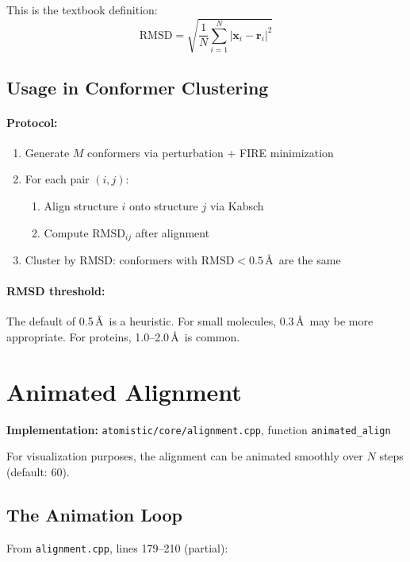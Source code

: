 \documentclass[11pt]{article}
\begin{document}
This is the textbook definition:
\begin{equation}
\text{RMSD} = \sqrt{\frac{1}{N}\sum_{i=1}^{N} |\mathbf{x}_i - \mathbf{r}_i|^2}
\end{equation}

\subsection{Usage in Conformer Clustering}

\paragraph{Protocol:}
\begin{enumerate}
\item Generate $M$ conformers via perturbation + FIRE minimization
\item For each pair $(i, j)$:
\begin{enumerate}
\item Align structure $i$ onto structure $j$ via Kabsch
\item Compute $\text{RMSD}_{ij}$ after alignment
\end{enumerate}
\item Cluster by RMSD: conformers with $\text{RMSD} < 0.5$\,\AA\ are the same
\end{enumerate}

\paragraph{RMSD threshold:} The default of 0.5\,\AA\ is a heuristic. For small molecules, 0.3\,\AA\ may be more appropriate. For proteins, 1.0--2.0\,\AA\ is common.

\section{Animated Alignment}

\textbf{Implementation:} \texttt{atomistic/core/alignment.cpp}, function \texttt{animated\_align}

For visualization purposes, the alignment can be animated smoothly over $N$ steps (default: 60).

\subsection{The Animation Loop}

From \texttt{alignment.cpp}, lines 179--210 (partial):
\end{document}

